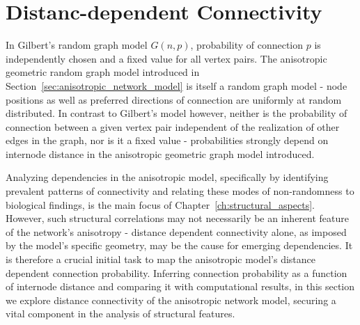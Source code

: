 

\section{Distanc-dependent Connectivity}
\label{sec:distance_connectivity}



In Gilbert's random graph model $G(n,p)$,
probability of connection $p$ is independently chosen and a fixed
value for all vertex pairs. The anisotropic geometric random graph model
introduced in Section~\ref{sec:anisotropic_network_model} is itself a
random graph model - node positions as well as preferred directions of
connection are uniformly at random distributed. In contrast to
Gilbert's model however, neither is the probability of connection
between a given vertex pair independent of the realization of other
edges in the graph, nor is it a fixed value - probabilities strongly
depend on internode distance in the anisotropic geometric graph model
introduced.

Analyzing dependencies in the anisotropic model, specifically by
identifying prevalent patterns of connectivity and relating these
modes of non-randomness to biological findings, is the main focus of
Chapter~\ref{ch:structural_aspects}. However, such structural
correlations may not necessarily be an inherent feature of the
network's anisotropy - distance dependent connectivity alone, as
imposed by the model's specific geometry, may be the cause for
emerging dependencies. It is therefore a crucial initial task to map
the anisotropic model's distance dependent connection
probability. Inferring connection probability as a function of
internode distance and comparing it with computational results, in
this section we explore distance connectivity of the anisotropic
network model, securing a vital component in the analysis of
structural features.

